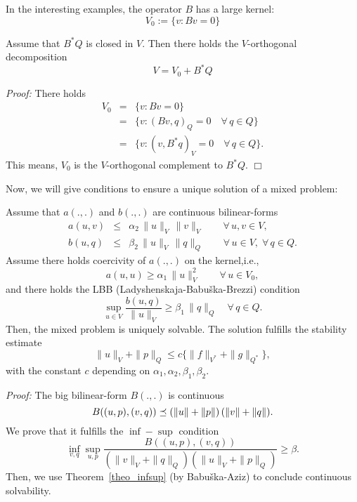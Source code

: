 \bigskip

In the interesting examples, the operator $B$ has a large kernel:
$$
V_0 := \{ v : B v = 0 \}
$$
\begin{lemma} Assume that $B^\ast Q$ is closed in $V$. Then there holds 
the $V$-orthogonal decomposition
$$
V = V_0 + B^\ast Q
$$
\end{lemma}
{\em Proof:} There holds
\begin{eqnarray*}
V_0 & = & \{ v : B v = 0 \} \\
   & = & \{ v : (B v, q)_Q = 0  \quad \forall \, q \in Q\} \\
   & = & \{ v : (v, B^\ast q)_V = 0 \quad \forall \, q \in Q \}.
\end{eqnarray*}
This means, $V_0$ is the $V$-orthogonal complement to $B^\ast Q$.
\hfill $\Box$


Now, we will give conditions to ensure a unique solution of a mixed
problem:
\begin{theorem} \label{theo_brezzi}
Assume that $a(.,.)$ and $b(.,.)$ are continuous bilinear-forms
\begin{eqnarray}
a(u,v) & \leq & \alpha_2 \, \| u \|_V \,  \| v \|_V \qquad \forall \, u,v \in V, \\
b(u,q) & \leq & \beta_2 \, \| u \|_V \, \| q \|_Q \qquad \forall \, u \in V, \; 
\forall \, q \in Q.
\end{eqnarray}
Assume there holds coercivity of $a(.,.)$ on the kernel,i.e.,
\begin{equation} \label{equ_kernelell}
a(u,u) \geq \alpha_1 \, \| u \|_V^2 \qquad \forall \, u \in V_0,
\end{equation}
and there holds the LBB (Ladyshenskaja-Babu\v{s}ka-Brezzi) condition
\begin{equation} \label{equ_lbb}
\sup_{u \in V} \frac{b(u,q)}{\|u\|_V} \geq \beta_1 \, \| q \|_Q \quad \forall \, q \in Q.
\end{equation}
Then, the mixed problem is uniquely solvable. The solution fulfills
the stability estimate
$$
\| u \|_V + \| p \|_Q \leq c \{ \| f \|_{V^\ast} + \| g \|_{Q^\ast} \},
$$
with the constant $c$ depending on $\alpha_1, \alpha_2, \beta_1, \beta_2$.
\end{theorem}
{\em Proof:} The big bilinear-form $B(.,.)$ is continuous
$$
B((u,p),(v,q)) \preceq ( \| u \| + \| p \| ) \, ( \| v \| + \| q \| ).
$$
We prove that it fulfills the $\inf-\sup$ condition
$$
\inf_{v,q} \sup_{u,p} \frac{B((u,p),(v,q))}{ ( \|v\|_V+\|q\|_Q) (\|u\|_V+\|p\|_Q)} \geq \beta.
$$
Then, we use Theorem~\ref{theo_infsup} (by Babu\v{s}ka-Aziz) to conclude
continuous solvability.

